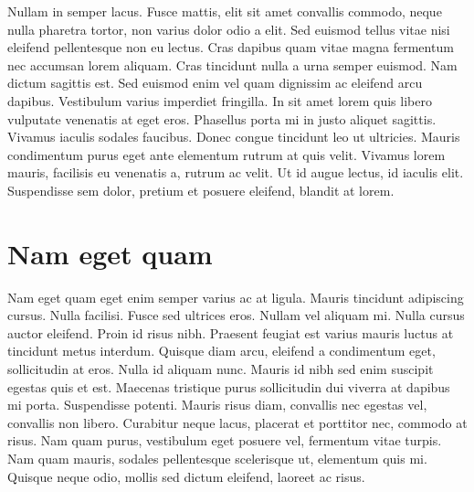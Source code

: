 Nullam in semper lacus.
Fusce mattis, elit sit amet convallis commodo, neque nulla pharetra tortor, non varius dolor odio a elit.
Sed euismod tellus vitae nisi eleifend pellentesque non eu lectus.
Cras dapibus quam vitae magna fermentum nec accumsan lorem aliquam.
Cras tincidunt nulla a urna semper euismod.
Nam dictum sagittis est.
Sed euismod enim vel quam dignissim ac eleifend arcu dapibus.
Vestibulum varius imperdiet fringilla.
In sit amet lorem quis libero vulputate venenatis at eget eros.
Phasellus porta mi in justo aliquet sagittis.
Vivamus iaculis sodales faucibus.
Donec congue tincidunt leo ut ultricies.
Mauris condimentum purus eget ante elementum rutrum at quis velit.
Vivamus lorem mauris, facilisis eu venenatis a, rutrum ac velit.
Ut id augue lectus, id iaculis elit.
Suspendisse sem dolor, pretium et posuere eleifend, blandit at lorem.

\section{Nam eget quam}
Nam eget quam eget enim semper varius ac at ligula.
Mauris tincidunt adipiscing cursus.
Nulla facilisi.
Fusce sed ultrices eros.
Nullam vel aliquam mi.
Nulla cursus auctor eleifend.
Proin id risus nibh.
Praesent feugiat est varius mauris luctus at tincidunt metus interdum.
Quisque diam arcu, eleifend a condimentum eget, sollicitudin at eros.
Nulla id aliquam nunc.
Mauris id nibh sed enim suscipit egestas quis et est.
Maecenas tristique purus sollicitudin dui viverra at dapibus mi porta.
Suspendisse potenti.
Mauris risus diam, convallis nec egestas vel, convallis non libero.
Curabitur neque lacus, placerat et porttitor nec, commodo at risus.
Nam quam purus, vestibulum eget posuere vel, fermentum vitae turpis.
Nam quam mauris, sodales pellentesque scelerisque ut, elementum quis mi.
Quisque neque odio, mollis sed dictum eleifend, laoreet ac risus.

